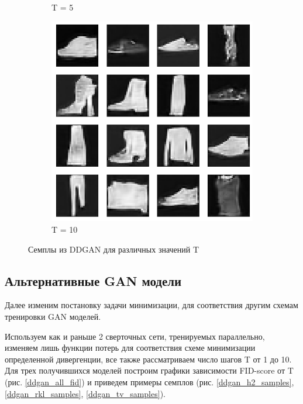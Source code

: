 \documentclass{article}
\begin{document}
\begin{figure}[H]
\begin{subfigure}[h]{0.3\linewidth}
		\caption{T = 5}
	\end{subfigure}
	\hfill
	\begin{subfigure}[h]{0.3\linewidth}
		\centering
		\includegraphics[scale=0.3]{../code/generated_DDGAN_10.png}
		\caption{T = 10}
	\end{subfigure}
	\caption{Семплы из DDGAN для различных значений T}\label{ddgan_samples}	
\end{figure}

\subsection{Альтернативные GAN модели}

Далее изменим постановку задачи минимизации, для соответствия другим схемам тренировки GAN моделей. 

Используем как и раньше 2 сверточных сети, тренируемых параллельно, изменяем лишь функции потерь для соответствия схеме минимизации определенной дивергенции, все также рассматриваем число шагов T от 1 до 10. Для трех получившихся моделей построим графики зависимости FID-score от T (рис. \ref{ddgan_all_fid}) и приведем примеры семплов (рис. \ref{ddgan_h2_samples}, \ref{ddgan_rkl_samples}, \ref{ddgan_tv_samples}).
\end{document}
